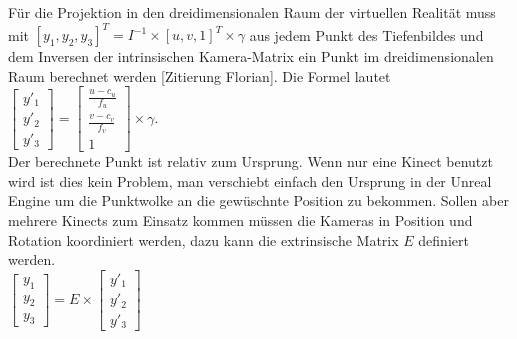 \documentclass[a4paper]{IEEEtran}
\begin{document}
	Für die Projektion in den dreidimensionalen Raum der virtuellen Realität muss mit $[y_1,y_2,y_3]^T = I^{-1} \times [u,v,1]^T \times \gamma$ aus jedem Punkt des Tiefenbildes und dem Inversen der intrinsischen Kamera-Matrix ein Punkt im dreidimensionalen Raum berechnet werden [Zitierung Florian].
	Die Formel lautet \\[1cm]

$\begin{bmatrix}
y'_1 \\
y'_2 \\
y'_3
\end{bmatrix}
= \begin{bmatrix}
\frac{u - c_u}{f_u} \\
\frac{v - c_v}{f_v}  \\
1  
\end{bmatrix}
\times
\gamma$.\\[1cm]

	Der berechnete Punkt ist relativ zum Ursprung. 
	Wenn nur eine Kinect benutzt wird ist dies kein Problem, man verschiebt einfach den Ursprung in der Unreal Engine um die Punktwolke an die gewüschnte Position zu bekommen. 
	Sollen aber mehrere Kinects zum Einsatz kommen müssen die Kameras in Position und Rotation koordiniert werden, dazu kann die extrinsische Matrix $E$ definiert werden. \\[1cm]

$\begin{bmatrix}
y_1 \\
y_2 \\
y_3
\end{bmatrix}
= E
\times
\begin{bmatrix}
y'_1 \\
y'_2 \\
y'_3
\end{bmatrix}$\\[1cm]
\end{document}
